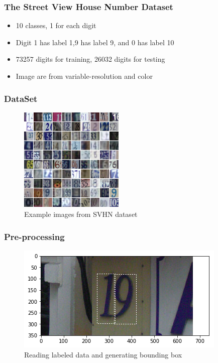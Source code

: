 \documentclass[11.5pt,aspectratio=1610,xcolor={usenames,dvipsnames,table}]{beamer}
\begin{document}
\begin{frame}

\frametitle{The Street View House Number Dataset \cite{SVHN}}

\begin{itemize}
	\item 10 classes, 1 for each digit
	\item Digit 1 has label 1,9 has label 9, and 0 has label 10
	\item 73257 digits for training, 26032 digits for testing
	\item Image are from variable-resolution and color 
\end{itemize}

\end{frame}


\begin{frame}

\frametitle{DataSet}

\begin{figure}[!h]
	\includegraphics[width=\textwidth, height = 5cm]{images/dataset.png}
	\caption{Example images from SVHN dataset \cite{SVHN}}
\end{figure}

\end{frame}

\begin{frame}

\frametitle{Pre-processing}

\begin{figure}[!h]
\includegraphics[width=\textwidth]{images/19.png}
\caption{Reading labeled data and generating bounding box}

\end{figure}
\end{frame}
\end{document}
